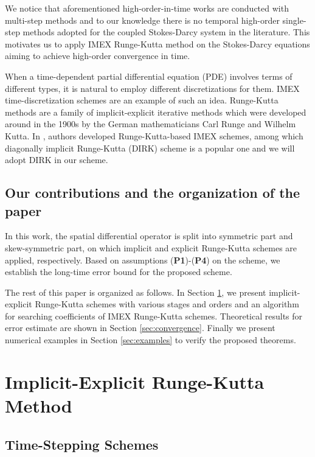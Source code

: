 We notice that aforementioned high-order-in-time works are conducted with multi-step methods and to our knowledge there is no temporal high-order single-step methods adopted for the coupled Stokes-Darcy system in the literature. This motivates us to apply IMEX Runge-Kutta method on the Stokes-Darcy equations aiming to achieve high-order convergence in time.

When a time-dependent partial differential equation (PDE) involves terms of different types, it is natural to employ different discretizations for them. IMEX time-discretization schemes are an example of such an idea. Runge-Kutta methods are a family of implicit-explicit iterative methods which were developed around in the 1900s by the German mathematicians Carl Runge and Wilhelm Kutta. In \cite{AscherRuuthSpiteri:1997}, authors developed Runge-Kutta-based IMEX schemes, among which diagonally implicit Runge-Kutta (DIRK) \cite{WannerHairer:1996} scheme is a popular one and we will adopt DIRK in our scheme.



\subsection{Our contributions and the organization of the paper}

In this work, the spatial differential operator is split into symmetric part and skew-symmetric part, on which implicit and explicit Runge-Kutta schemes are applied, respectively. Based on assumptions ({\bf P1})-({\bf P4}) on the scheme, we establish the long-time error bound for the proposed scheme. 

The rest of this paper is organized as follows.  In Section \ref{sec:IMEX}, we present implicit-explicit Runge-Kutta schemes with various stages and orders and an algorithm for searching coefficients of IMEX Runge-Kutta schemes. Theoretical results for error estimate are shown in Section \ref{sec:convergence}. Finally we present numerical examples in Section \ref{sec:examples} to verify the proposed theorems.



\section{Implicit-Explicit Runge-Kutta Method}\label{sec:IMEX}

\subsection{Time-Stepping Schemes}


